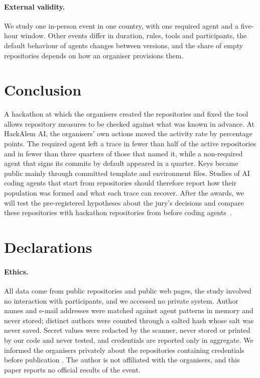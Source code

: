 \documentclass{article}
\begin{document}
\paragraph{External validity.} We study one in-person event in one country, with one required agent and a five-hour window. Other events differ in duration, rules, tools and participants, the default behaviour of agents changes between versions, and the share of empty repositories depends on how an organiser provisions them.

\section{Conclusion}\label{sec:conclusion}

A hackathon at which the organisers created the repositories and fixed the tool allows repository measures to be checked against what was known in advance. At HackAlem AI, the organisers' own actions moved the activity rate by \NRqOneActiveGapPp{} percentage points. The required agent left a trace in fewer than half of the active repositories and in fewer than three quarters of those that named it, while a non-required agent that signs its commits by default appeared in a quarter. Keys became public mainly through committed template and environment files. Studies of AI coding agents that start from repositories should therefore report how their population was formed and what each trace can recover. After the awards, we will test the pre-registered hypotheses about the jury's decisions and compare these repositories with hackathon repositories from before coding agents~\cite{halmans2026hackrep}.

\section*{Declarations}

\paragraph{Ethics.} All data come from public repositories and public web pages, the study involved no interaction with participants, and we accessed no private system. Author names and e-mail addresses were matched against agent patterns in memory and never stored; distinct authors were counted through a salted hash whose salt was never saved. Secret values were redacted by the scanner, never stored or printed by our code and never tested, and credentials are reported only in aggregate. We informed the organisers privately about the repositories containing credentials before publication . The author is not affiliated with the organisers, and this paper reports no official results of the event. 
\end{document}
